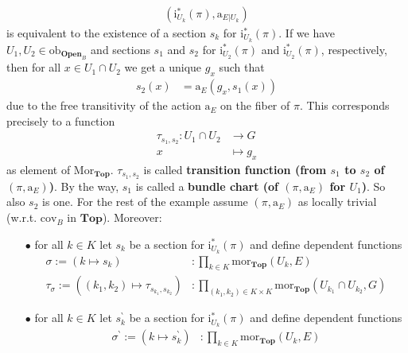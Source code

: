\begin{exa}[Bundles 2]
\begin{align*}
  \left(
    \mathrm{i}_{U_{k}}^{\ast}(\pi),
    \mathrm{a}_{E \vert U_{k}}
  \right)
\end{align*}
is equivalent to the existence of a section $s_{k}$ for $\mathrm{i}_{U_{k}}^{\ast}(\pi)$. If we have $U_{1},U_{2} \in \mathrm{ob}_{\mathbf{Open}_{B}}$ and sections $s_{1}$ and $s_{2}$ for $\mathrm{i}_{U_{2}}^{\ast}(\pi)$ and $\mathrm{i}_{U_{2}}^{\ast}(\pi)$, respectively, then for all $x \in U_{1} \cap U_{2}$ we get a unique $g_{x}$ such that
\begin{align*}
  s_{2}(x)
  &=
  \mathrm{a}_{E}
  \left(
    g_{x},
    s_{1}(x)
  \right)
\end{align*}
due to the free transitivity of the action $\mathrm{a}_{E}$ on the fiber of $\pi$. This corresponds precisely to a function
\begin{align*}
  \tau_{s_{1},s_{2}}
  \colon
  U_{1}
  \cap
  U_{2}
  &\rightarrow
  G
  \\
  x
  &\mapsto
  g_{x}
\end{align*}
as element of $\mathrm{Mor}_{\mathbf{Top}}$. $\tau_{s_{1},s_{2}}$ is called \textbf{transition function (from $s_{1}$ to $s_{2}$ of $(\pi,\mathrm{a}_{E})$)}. By the way, $s_{1}$ is called a \textbf{bundle chart (of $(\pi,\mathrm{a}_{E})$ for $U_{1}$)}. So also $s_{2}$ is one. For the rest of the example assume $(\pi,\mathrm{a}_{E})$ as locally trivial (w.r.t. $\mathrm{cov}_{B}$ in $\mathbf{Top}$). Moreover:
\begin{enumerate}
\item[$\bullet$]
for all $k \in K$ let $s_{k}$ be a section for $\mathrm{i}_{U_{k}}^{\ast}(\pi)$ and define dependent functions
\begin{align*}
  \sigma
  :=
  \left(
    k
    \mapsto
    s_{k}
  \right)
  &\colon
  \prod_{k \in K}
  \mathrm{mor}_{\mathbf{Top}}(U_{k},E)
  \\
  \tau_{\sigma}
  :=
  \left(
    (k_{1},k_{2})
    \mapsto
    \tau_{s_{k_{1}},s_{k_{2}}}
  \right)
  &\colon
  \prod_{(k_{1},k_{2}) \in K \times K}
  \mathrm{mor}_{\mathbf{Top}}(U_{k_{1}} \cap U_{k_{2}},G)
\end{align*}
\item[$\bullet$]
for all $k \in K$ let $s_{k}^{\backprime}$ be a section for $\mathrm{i}_{U_{k}}^{\ast}(\pi)$ and define dependent functions
\begin{align*}
  \sigma^{\backprime}
  :=
  \left(
    k
    \mapsto
    s_{k}^{\backprime}
  \right)
  &\colon
  \prod_{k \in K}
  \mathrm{mor}_{\mathbf{Top}}(U_{k},E)

\end{align*}
\end{enumerate}
\end{exa}
